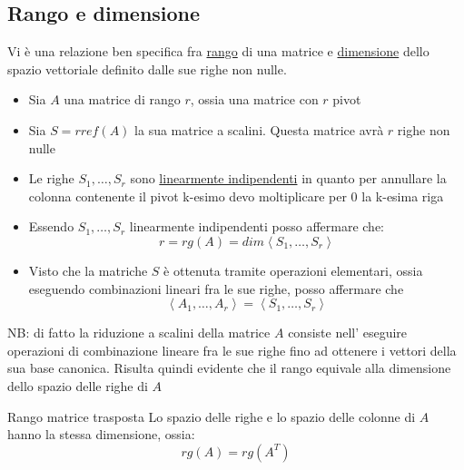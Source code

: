 \subsection{Rango e dimensione}
Vi è una relazione ben specifica fra \underline{rango} di una matrice e  \underline{dimensione} dello spazio vettoriale definito dalle sue righe non nulle.
\begin{itemize}
	\item Sia $A$ una matrice di rango $r$, ossia una matrice con $r$ pivot
	\item Sia $S= rref\left( A \right) $ la sua matrice a scalini. Questa matrice avrà $r$ righe non nulle
	\item Le righe $S_1,\ldots, S_r$ sono \underline{linearmente indipendenti} in quanto per annullare la colonna contenente il pivot k-esimo devo moltiplicare per $0$ la k-esima riga
	\item Essendo $S_1,\ldots,S_r$ linearmente indipendenti posso affermare che:
	      \[
		      r=rg\left( A \right) = dim \left<S_1,\ldots,S_r \right>
	      \]
	\item Visto che la matriche $ S$ è ottenuta tramite operazioni elementari, ossia eseguendo combinazioni lineari fra le sue righe, posso affermare che
	      \[
		      \left<A_1,\ldots,A_r \right> = \left<S_1,\ldots,S_r \right>
	      \]
\end{itemize}
NB: di fatto la riduzione a scalini della matrice $ A $ consiste nell' eseguire operazioni di combinazione lineare fra le sue righe fino ad ottenere i vettori della sua base canonica. Risulta quindi evidente che il rango equivale alla dimensione dello spazio delle righe di $ A $

\begin{teorema}{Rango matrice trasposta}
	Lo spazio delle righe e lo spazio delle colonne di $A$ hanno la stessa dimensione, ossia:
	\[
		rg\left( A \right)  = rg\left( A^{T} \right)
	\]
\end{teorema}

